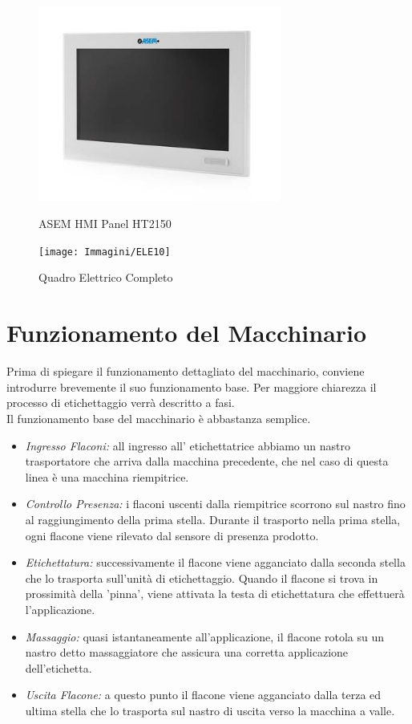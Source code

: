 \documentclass[12pt, a4paper, oneside]{book}
\begin{document}
\begin{itemize}
	\begin{figure}[H]
		\centering
		\includegraphics[width=8cm]{Immagini/ELE9}
		\label{ele9}
		\caption{ASEM HMI Panel HT2150}
	\end{figure}
	
	\end{itemize}

	\begin{figure}[H]
	\centering
	\texttt{[image: Immagini/ELE10]}
	\label{ele10}
	\caption{Quadro Elettrico Completo}
	\end{figure}

\section{Funzionamento del Macchinario}
Prima di spiegare il funzionamento dettagliato del macchinario, conviene introdurre brevemente il suo funzionamento base. Per maggiore chiarezza il processo di etichettaggio verrà descritto a fasi.
\\
Il funzionamento base del macchinario è abbastanza semplice. 
	\begin{itemize}
	\item \textit{Ingresso Flaconi:} all ingresso all' etichettatrice abbiamo un nastro trasportatore che arriva dalla macchina precedente, che nel caso di questa linea è una macchina riempitrice.
	\item \textit{Controllo Presenza:}  i flaconi uscenti dalla riempitrice scorrono sul nastro fino al raggiungimento della prima stella. Durante il trasporto nella prima stella, ogni flacone viene rilevato dal sensore di presenza prodotto.
	\item \textit{Etichettatura:} successivamente il flacone viene agganciato dalla seconda stella che lo trasporta sull'unità di etichettaggio. Quando il flacone si trova in prossimità della 'pinna', viene attivata la testa di etichettatura che effettuerà l'applicazione.
	\item \textit{Massaggio:} quasi istantaneamente all'applicazione, il flacone rotola su un nastro detto massaggiatore che assicura una corretta applicazione dell'etichetta.
	\item \textit{Uscita Flacone:} a questo punto il flacone viene agganciato dalla terza ed ultima stella che lo trasporta sul nastro di uscita verso la macchina a valle. 
	\end{itemize}
\end{document}
